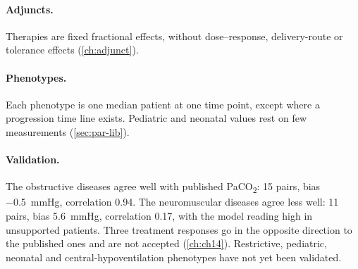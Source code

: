 \paragraph{Adjuncts.} Therapies are fixed fractional effects, without dose--response, delivery-route or tolerance effects (\cref{ch:adjunct}).

\paragraph{Phenotypes.} Each phenotype is one median patient at one time point, except where a progression time line exists. Pediatric and neonatal values rest on few measurements (\cref{sec:par-lib}).

\paragraph{Validation.} The obstructive diseases agree well with published PaCO\textsubscript{2}: 15 pairs, bias \SI{-0.5}{\mmHg}, correlation 0.94. The neuromuscular diseases agree less well: 11 pairs, bias \SI{+5.6}{\mmHg}, correlation 0.17, with the model reading high in unsupported patients. Three treatment responses go in the opposite direction to the published ones and are not accepted (\cref{ch:ch14}). Restrictive, pediatric, neonatal and central-hypoventilation phenotypes have not yet been validated.

